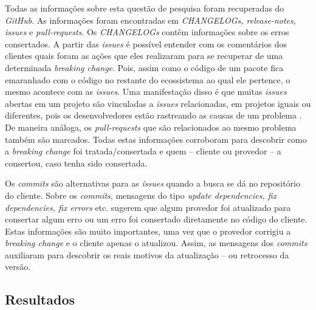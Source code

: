 Todas as informações sobre esta questão de pesquisa foram recuperadas do \textit{GitHub}. As informações foram encontradas em \textit{CHANGELOGs, release-notes, issues} e \textit{pull-requests}. Os \textit{CHANGELOGs} contêm informações sobre os erros consertados. A partir das \textit{issues} é possível entender com os comentários dos clientes quais foram as ações que eles realizaram para se recuperar de uma determinada \textit{breaking change}. Pois, assim como o código de um pacote fica emaranhado com o código no restante do ecossistema ao qual ele pertence, o mesmo acontece com as \textit{issues}. Uma manifestação disso é que muitas \textit{issues} abertas em um projeto são vinculadas a \textit{issues} relacionadas, em projetos iguais ou diferentes, pois os desenvolvedores estão rastreando as causas de um problema \cite{Zhang:2018:WIL:3242887.3242891}. De maneira análoga, os \textit{pull-requests} que são relacionados ao mesmo problema também são marcados. Todas estas informações corroboram para descobrir como a \textit{breaking change} foi tratada/consertada e quem -- cliente ou provedor -- a consertou, caso tenha sido consertada.

Os \textit{commits} são alternativas para as \textit{issues} quando a busca se dá no repositório do cliente. Sobre os \textit{commits}, mensagens do tipo \textit{update dependencies, fix dependencies, fix errors} etc. sugerem que algum provedor foi atualizado para consertar algum erro ou um erro foi consertado diretamente no código do cliente. Estas informações são muito importantes, uma vez que o provedor corrigiu a \textit{breaking change} e o cliente apenas o atualizou. Assim, as mensagens dos \textit{commits} auxiliaram para descobrir os reais motivos da atualização -- ou retrocesso da versão.

\subsection{Resultados}
\label{d_fin:rq3}